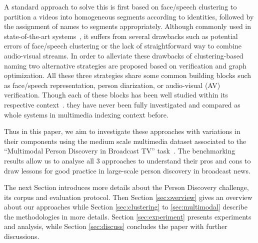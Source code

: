 A standard approach to solve this is first based on face/speech clustering to partition a videos into homogeneous segments according to identities, followed by the assignment of names to segments appropriately.
%
Although commonly used in state-of-the-art systems~\cite{le2015eumssi,poignant2012fusion}, it suffers from several drawbacks such as potential errors of face/speech clustering or the lack of straightforward way to combine audio-visual streams.
%
In order to alleviate these drawbacks of clustering-based naming %
two alternative strategies are proposed based on verification and graph optimization. 
%
All these three strategies share some common building blocks such as face/speech representation, person diarization, or audio-visual (AV) verification. Though each of these blocks has been well studied within its respective context~\cite{parkhi15deep,wallace2012total,Schroff2015,Ben}. 
%
they have never been fully investigated and compared as whole systems in  multimedia indexing context before. 

Thus in this paper, we  aim to investigate these approaches with variations in their components using the medium  scale multimedia dataset associated to the ``Multimodal Person Discovery in Broadcast TV'' task~\cite{POIGNANT--MEDIAEVAL--2015,bredin2016mediaeval}.
%
The benchmarking results allow us to analyse all 3 approaches to understand their pros and cons to draw lessons for good practice in large-scale person discovery in broadcast news.

The next Section introduces more details about the Person Discovery challenge, its corpus and evaluation protocol.
Then Section \ref{sec:overview} gives an overview about our approaches while Section \ref{sec:clustering} to \ref{sec:multimodal}
 describe the methodologies in more details.
Section \ref{sec:experiment} presents experiments and analysis, while 
Section \ref{sec:discuss} concludes the paper 
with further discussions.

\endinput
